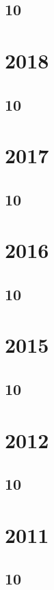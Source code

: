 \documentclass[11pt]{book}
\begin{document}
\subsection{10}

\section{2018} 
\subsection{10}


\section{2017}
\subsection{10}

\section{2016}
\subsection{10}

\section{2015}
\subsection{10}


\section{2012}
\subsection{10}


\section{2011}
\subsection{10}

\end{document}
